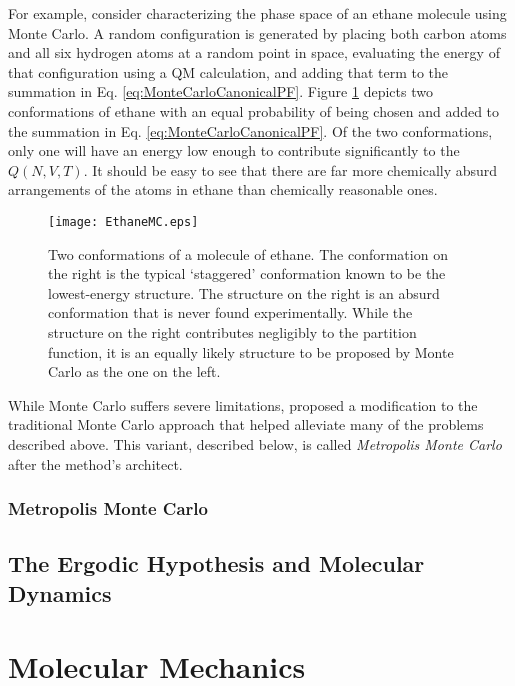 For example, consider characterizing the phase space of an ethane molecule using
Monte Carlo. A random configuration is generated by placing both carbon atoms
and all six hydrogen atoms at a random point in space, evaluating the energy of
that configuration using a QM calculation, and adding that term to the summation
in Eq. \ref{eq:MonteCarloCanonicalPF}. Figure \ref{fig:EthaneMC} depicts two
conformations of ethane with an equal probability of being chosen and added to
the summation in Eq. \ref{eq:MonteCarloCanonicalPF}. Of the two conformations,
only one will have an energy low enough to contribute significantly to the $Q(N,
V, T)$. It should be easy to see that there are far more chemically absurd
arrangements of the atoms in ethane than chemically reasonable ones.

\begin{figure}
   \texttt{[image: EthaneMC.eps]}
   \caption{Two conformations of a molecule of ethane. The conformation on the
            right is the typical `staggered' conformation known to be the
            lowest-energy structure. The structure on the right is an absurd
            conformation that is never found experimentally. While the structure
            on the right contributes negligibly to the partition function, it is
            an equally likely structure to be proposed by Monte Carlo as the one
            on the left.}
   \label{fig:EthaneMC}
\end{figure}

While Monte Carlo suffers severe limitations,
\citeauthor{Metropolis_JChemPhys_1953_v21_p1087} proposed a modification to the
traditional Monte Carlo approach that helped alleviate many of the problems
described above. \cite{Metropolis_JChemPhys_1953_v21_p1087} This variant,
described below, is called \emph{Metropolis Monte Carlo} after the method's
architect.

\subsubsection*{Metropolis Monte Carlo}

\subsection{The Ergodic Hypothesis and Molecular Dynamics}

\section{Molecular Mechanics}

